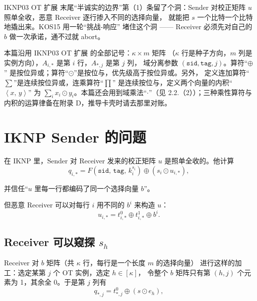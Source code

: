 

IKNP03 OT 扩展 末尾“半诚实的边界”第（1）条留了个洞：Sender
对校正矩阵 $u$ 照单全收，恶意 Receiver 逐行掺入不同的选择向量，
就能把 $s$ 一个比特一个比特地撬出来。KOS15 用一轮“挑战-响应”
堵住这个洞 ------ Receiver 必须先对自己的 $b$ 做一次承诺，通不过就
abort。

本篇沿用 IKNP03 OT 扩展 的全部记号：$\kappa\times m$ 矩阵
（$\kappa$ 行是种子方向，$m$ 列是实例方向），$A_{i,*}$ 是第 $i$ 行，$A_{*,j}$ 是第 $j$ 列，
域分离参数 $(\mathtt{sid}, \mathtt{tag}, j)$。算符“$\oplus$”
是按位异或；算符“$\odot$”是按位与，优先级高于按位异或。另外，
定义连加算符“$\sum$”是连续按位异或，连乘算符“$\prod$”
是连续按位与，定义两个向量的内积“$\left<x,\, y\right>$”
为 $\sum_i x_i\odot y_i$。本篇还会用到域乘法“$\cdot$”（见
2.2.（2））；三种乘性算符与内积的运算律备在附录 D，推导卡壳时请去那里对账。

\section{IKNP Sender 的问题}

在 IKNP 里，Sender 对 Receiver 发来的校正矩阵 $u$ 是照单全收的。他计算
\begin{equation}\label{eq:02-kos15:1}
q_{i,*} = F\left(\mathtt{sid},\,\mathtt{tag},\,k^{s_i}_i\right) \oplus \left(s_i \odot u_{i,*}\right),
\end{equation}

并信任“$u$ 里每一行都编码了同一个选择向量 $b$”。

但恶意 Receiver 可以对每行 $i$ 用不同的 $b^{i}$ 来构造 $u$：
\begin{equation}\label{eq:02-kos15:2}
u_{i,*} = t^0_{i,*} \oplus t^1_{i,*} \oplus b^{i}.
\end{equation}

\subsection{\texorpdfstring{Receiver 可以窥探 $s_h$}{Receiver 可以窥探s\_h}}

Receiver 对 $b$ 矩阵（共 $\kappa$ 行，每行是一个长度 $m$ 的选择向量）
进行这样的加工：选定某第 $j$ 个 OT 实例，选定 $h\in[\kappa]$，
令整个 $b$ 矩阵只有第 $(h, j)$ 个元素为 1，其余全 0。于是第 $j$ 列有
\begin{equation}\label{eq:02-kos15:3}
q_{*,j} = t^0_{*,j} \oplus \left(s \odot e_{h}\right),
\end{equation}

